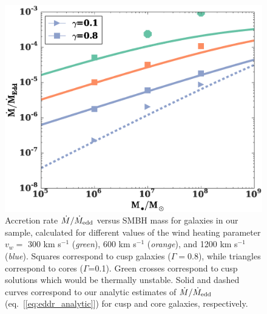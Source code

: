 \documentclass[usenatbib,fleqn]{mn2e}
\newcommand{\vwO}{v_{w}}
\begin{document}
\begin{figure}
  \includegraphics[width=\columnwidth]{mdot_mass.eps}
  \caption{\label{fig:mdot_mass} Accretion rate $\dot{M}/\dot{M}_{\rm
      edd}$ versus SMBH mass for galaxies in our sample, calculated
    for different values of the wind heating parameter $\vwO =$ 300 km
    s$^{-1}$ ({\it green}), 600 km s$^{-1}$ ({\it orange}), and 1200
    km s$^{-1}$ ({\it blue}).  Squares correspond to cusp galaxies
    ($\Gamma=0.8$), while triangles correspond to cores
    ($\Gamma$=0.1). Green crosses correspond to cusp solutions which
    would be thermally unstable.  Solid and dashed curves correspond
    to our analytic estimates of $\dot{M}/\dot{M}_{\rm edd}$
    (eq.~[\ref{eq:eddr_analytic}]) for cusp and core galaxies,
    respectively. }
\end{figure}
\end{document}
